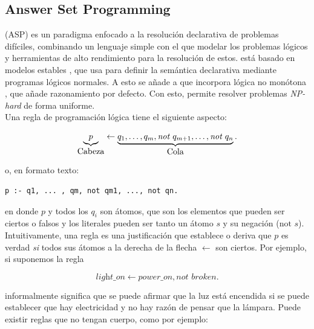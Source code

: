 \subsection{Answer Set Programming}\label{subsec:asp}

\asp (ASP) es un paradigma enfocado a la resolución declarativa de problemas difíciles, combinando un lenguaje simple con el que modelar los problemas lógicos y herramientas de alto rendimiento para la resolución de estos. \asp está basado en modelos estables \cite{stablemodels}, que usa para definir la semántica declarativa mediante programas lógicos normales. A esto se añade a que incorpora lógica no monótona \cite{nonmonotonic}, que añade razonamiento por defecto. Con esto, \asp permite resolver problemas \textit{NP-hard} de forma uniforme. \\

Una regla de programación lógica tiene el siguiente aspecto:

\begin{equation}
	\underbrace{p}_{\text{\normalsize Cabeza}} \leftarrow \underbrace{q_1, \dotsc, q_m , \textit{not } q_{m+1} ,\dotsc, \textit{not } q_n}_{\text{\normalsize Cola}}.
\end{equation}

\hspace{1em}

o, en formato texto:

\begin{lstlisting}[label=lst:qreached]
p :- q1, ... , qm, not qm1, ..., not qn.
\end{lstlisting}

en donde $p$ y todos los $q_i$ son átomos, que son los elementos que pueden ser ciertos o falsos y los literales pueden ser tanto un átomo $s$ y su negación ($\text{not } s$). Intuitivamente, una regla es una justificación que establece o deriva que $p$ es verdad \textit{si} todos sus átomos a la derecha de la flecha $\leftarrow$ son ciertos. Por ejemplo, si suponemos la regla

\begin{equation}\label{eq:light}
	\textit{light\_on} \leftarrow \textit{power\_on}, \textit{not } broken.
\end{equation}

informalmente significa que se puede afirmar que la luz está encendida si se puede establecer que hay electricidad y no hay razón de pensar que la lámpara. Puede existir reglas que no tengan cuerpo,  como por ejemplo:

